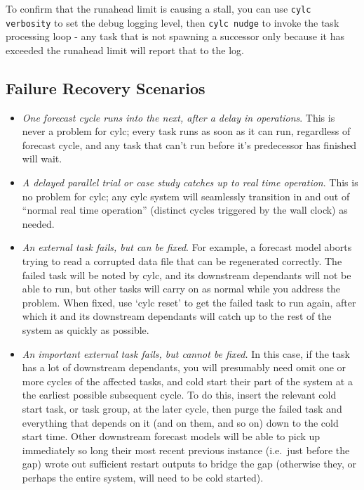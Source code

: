 \documentclass[11pt,a4paper]{article}
\begin{document}
To confirm that the runahead limit is causing a stall, you can use 
\lstinline=cylc verbosity= to set the debug logging level, then
\lstinline=cylc nudge= to invoke the task processing loop - any task
that is not spawning a successor only because it has exceeded the runahead
limit will report that to the log.


\subsection{Failure Recovery Scenarios}
\label{FailureRecoveryScenarios}

\begin{itemize}
    \item {\em One forecast cycle runs into the next, after a delay in
        operations}. This is never a problem for cylc; every task runs
        as soon as it can run, regardless of forecast cycle, and any
        task that can't run before it's predecessor has finished will
        wait.

    \item {\em A delayed parallel trial or case study catches up to real
        time operation}. This is no problem for cylc; any cylc system
        will seamlessly transition in and out of ``normal real time
        operation'' (distinct cycles triggered by the wall clock) as needed.

    \item {\em An external task fails, but can be fixed}. For example, a
        forecast model aborts trying to read a corrupted data file that
        can be regenerated correctly. The failed task will be noted by
        cylc, and its downstream dependants will not be able to run,
        but other tasks will carry on as normal while you address the
        problem. When fixed, use `cylc reset' to get the failed task to
        run again, after which it and its downstream dependants will
        catch up to the rest of the system as quickly as possible.

    \item {\em An important external task fails, but cannot be fixed.}
        In this case, if the task has a lot of downstream dependants,
        you will presumably need omit one or more cycles of the affected
        tasks, and cold start their part of the system at a the earliest
        possible subsequent cycle.  To do this, insert the relevant cold
        start task, or task group, at the later cycle, then purge the
        failed task and everything that depends on it (and on them, and
        so on) down to the cold start time.  Other downstream forecast
        models will be able to pick up immediately so long their most
        recent previous instance (i.e.\ just before the gap) wrote out
        sufficient restart outputs to bridge the gap (otherwise they,
        or perhaps the entire system, will need to be cold started). 


\end{itemize}
\end{document}
